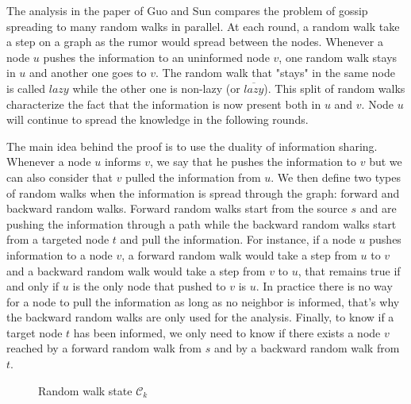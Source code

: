 \documentclass[10pt,journal,a4paper]{IEEEtran}
\begin{document}
The analysis in the paper of Guo and Sun \cite{guosun} compares the problem of gossip spreading to many random walks in parallel. At each round, a random walk take a step on a graph as the rumor would spread between the nodes. Whenever a node $u$ pushes the information to an uninformed node $v$, one random walk stays in $u$ and another one goes to $v$. The random walk that "stays" in the same node is called $lazy$ while the other one is non-lazy (or $\overline{lazy}$). This split of random walks characterize the fact that the information is now present both in $u$ and $v$. Node $u$ will continue to spread the knowledge in the following rounds.

The main idea behind the proof is to use the duality of information sharing. Whenever a node $u$ informs $v$, we say that he pushes the information to $v$ but we can also consider that $v$ pulled the information from $u$. We then define two types of random walks when the information is spread through the graph: forward and backward random walks. Forward random walks start from the source $s$ and are pushing the information through a path while the backward random walks start from a targeted node $t$ and pull the information. For instance, if a node $u$ pushes information to a node $v$, a forward random walk would take a step from $u$ to $v$ and a backward random walk would take a step from $v$ to $u$, that remains true if and only if $u$ is the only node that pushed to $v$ is $u$. In practice there is no way for a node to pull the information as long as no neighbor is informed, that's why the backward random walks are only used for the analysis. Finally, to know if a target node $t$ has been informed, we only need to know if there exists a node $v$ reached by a forward random walk from $s$ and by a backward random walk from $t$.


\begin{figure}[h]
\centering
{}
\caption{Random walk state $\mathcal C_k$}
\label{fig:lazyFSM}
\end{figure}
\end{document}
